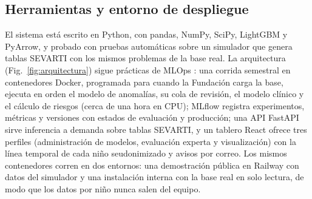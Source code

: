\subsection{Herramientas y entorno de despliegue}
\label{sec:despliegue}
El sistema está escrito en Python, con pandas, NumPy, SciPy, LightGBM y PyArrow, y probado con pruebas automáticas sobre un simulador que genera tablas SEVARTI con los mismos problemas de la base real. La arquitectura (Fig.~\ref{fig:arquitectura}) sigue prácticas de MLOps \cite{kreuzberger2023}: una corrida semestral en contenedores Docker, programada para cuando la Fundación carga la base, ejecuta en orden el modelo de anomalías, su cola de revisión, el modelo clínico y el cálculo de riesgos (cerca de una hora en CPU); MLflow \cite{zaharia2018} registra experimentos, métricas y versiones con estados de evaluación y producción; una API FastAPI sirve inferencia a demanda sobre tablas SEVARTI, y un tablero React ofrece tres perfiles (administración de modelos, evaluación experta y visualización) con la línea temporal de cada niño seudonimizado y avisos por correo. Los mismos contenedores corren en dos entornos: una demostración pública en Railway con datos del simulador y una instalación interna con la base real en solo lectura, de modo que los datos por niño nunca salen del equipo.



